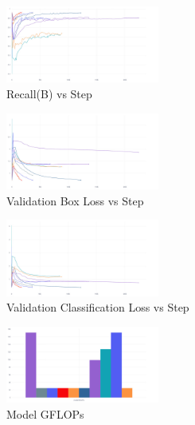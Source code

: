 \documentclass[11pt]{IEEEtran}
\begin{document}
\begin{figure}[ht!]
    \centering
    \includegraphics[width=0.45\textwidth]{metrics_recall(B) VS step.jpeg}
    \caption{Recall(B) vs Step}
\end{figure}

\begin{figure}[ht!]
    \centering
    \includegraphics[width=0.45\textwidth]{val_box_loss VS step.jpeg}
    \caption{Validation Box Loss vs Step}
\end{figure}

\begin{figure}[ht!]
    \centering
    \includegraphics[width=0.45\textwidth]{val_cls_loss VS step.jpeg}
    \caption{Validation Classification Loss vs Step}
\end{figure}

\begin{figure}[ht!]
    \centering
    \includegraphics[width=0.45\textwidth]{model_GFLOPs.jpeg}
    \caption{Model GFLOPs}
\end{figure}
\end{document}
